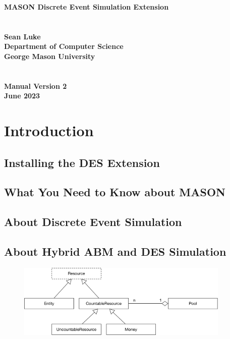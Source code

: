 \documentclass[twoside,10pt]{article}
\newcommand\booktitle{MASON Discrete Event Simulation Extension}
\begin{document}
\noindent\huge\bf \booktitle\\
\\
\\
\Large\bf Sean Luke\\
{\large\rm 
Department of Computer Science\\
George Mason University}
\\
\\
\\
\large\rm {\bf Manual Version 2}\\
\large\rm June 2023\\

\clearpage



\normalsize
\cleardoublepage

\tableofcontents
\clearpage

\section{Introduction}

\subsection{Installing the DES Extension}

\subsection{What You Need to Know about MASON}

\subsection{About Discrete Event Simulation}

\subsection{About Hybrid ABM and DES Simulation}

\begin{figure}[t]
\centering\includegraphics[width=4in]{Resources.pdf}
\end{figure}
\end{document}
